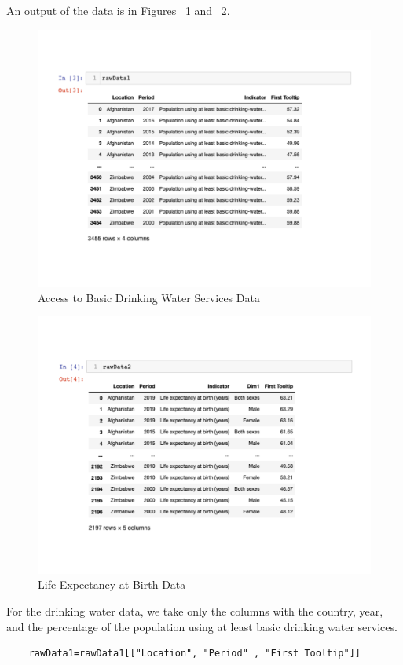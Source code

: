 \documentclass[12pt]{article}
\begin{document}
An output of the data is in Figures ~\ref{fig1} and ~\ref{fig2}.
\begin{figure}
    \centering
    \includegraphics[width=5in]{Figures/data1.pdf}
    \caption{Access to Basic Drinking Water Services Data}
    \label{fig1}
\end{figure}
\begin{figure}
    \centering
    \includegraphics[width=5in]{Figures/data2.pdf}
    \caption{Life Expectancy at Birth Data}
    \label{fig2}
\end{figure}
For the drinking water data, we take only the columns with the country, year, and the percentage of the population using at least basic drinking water services.
\begin{verbatim}
    rawData1=rawData1[["Location", "Period" , "First Tooltip"]]
\end{verbatim}
\end{document}

